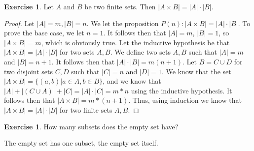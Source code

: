 \documentclass[12pt]{article}
\theoremstyle{definition}
\newtheorem{exercise}[theorem]{Exercise}
\numberwithin{equation}{subsection}
\begin{document}
{\begin{exercise}
Let $A$ and $B$ be two finite sets.  Then $|A\times B|=|A|\cdot |B|$.
\end{exercise}
\begin{proof}
Let $|A| = m, |B| = n$.
We let the proposition $P(n): |A \times B| = |A| \cdot |B|$. To prove the base case, we let $n = 1$. It follows then that $|A| = m$, $|B| = 1$, so $|A \times B| = m$, which is obviously true.
Let the inductive hypothesis be that $|A \times B|  = |A| \cdot |B|$ for two sets $A,B$. We define two sets $A, B$ such that $|A| = m$ and $|B| = n + 1$. It follows then that $|A| \cdot |B| = m(n+1)$. Let $B = C \cup D$ for two disjoint sets $C,D$ such that $|C| = n$ and $|D| = 1$. We know that the set $|A \times B| = \{(a,b)|a \in A,b \in B\}$, and we know that $|A| + |(C \cup A)| + |C| = |A| \cdot |C| = m * n$ using the inductive hypothesis. It follows then that $|A \times B| = m * (n + 1)$. Thus, using induction we know that $|A \times B| = |A| \cdot |B|$ for two finite sets $A, B$.
\end{proof}

\begin{exercise}  
How many subsets does the empty set have?
\end{exercise}
The empty set has one subset, the empty set itself.

}
\end{document}
